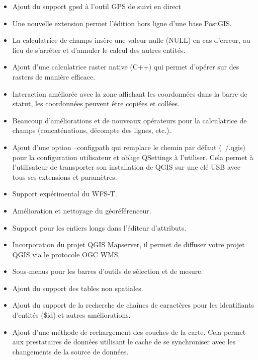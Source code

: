 \begin{itemize}[label=--]
\item Ajout du support gpsd à l'outil GPS de suivi en direct
\item Une nouvelle extension permet l'édition hors ligne d'une base PostGIS.
\item La calculatrice de champs insère une valeur nulle (NULL) en cas d'erreur, au lieu de s'arrêter et d'annuler le calcul des autres entités.
\item Ajout d'une calculatrice raster native (C++) qui permet d'opérer sur des rasters de manière efficace.
\item Interaction améliorée avec la zone affichant les coordonnées dans la barre de statut, les coordonnées peuvent être copiées et collées.
\item Beaucoup d'améliorations et de nouveaux opérateurs pour la calculatrice de champs (concaténations, décompte des lignes, etc.).
\item Ajout d'une option --configpath qui remplace le chemin par défaut (~/.qgis) pour la configuration utilisateur et oblige QSettings à l'utiliser. Cela permet à l'utilisateur de transporter son installation de QGIS sur une clé USB avec tous ses extensions et paramètres.
\item Support expérimental du WFS-T.
\item Amélioration et nettoyage du géoréférenceur.
\item Support pour les entiers longs dans l'éditeur d'attributs.
\item Incorporation du projet QGIS Mapserver, il permet de diffuser votre projet QGIS via le protocole OGC WMS.
\item Sous-menus pour les barres d'outils de sélection et de mesure.
\item Ajout du support des tables non spatiales.
\item Ajout du support de la recherche de chaînes de caractères pour les identifiants d'entités (\$id) et autres améliorations.
\item Ajout d'une méthode de rechargement des couches de la carte. Cela permet aux prestataires de données utilisant le cache de se synchroniser avec les changements de la source de données.
\end{itemize}

